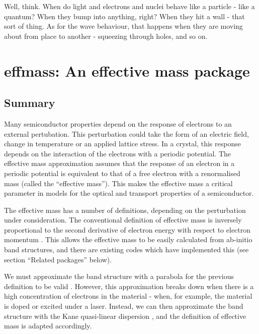 \begin{savequote}[8cm]
Well, think. When do light and electrons and nuclei behave like a particle - like a quantum? When they bump into anything, right? When they hit a wall - that sort of thing. As for the wave behaviour, that happens when they are moving about from place to another - squeezing through holes, and so on.
\end{savequote}

\chapter{\label{app:1-effmass}effmass: An effective mass package}

\section{Summary}
\label{sec:summary}

Many semiconductor properties depend on the response of electrons to an external pertubation. This perturbation could take the form of an electric field, change in temperature or an applied lattice stress. In a crystal, this response depends on the interaction of the electrons with a periodic potential. The effective mass approximation assumes that the response of an electron in a periodic potential is equivalent to that of a free electron with a renormalised mass (called the ``effective mass''). This makes the effective mass a critical parameter in models for the optical and transport properties of a semiconductor.

The effective mass has a number of definitions, depending on the perturbation under consideration. The conventional definition of effective mass is inversely proportional to the second derivative of electron energy with respect to electron momentum \autocite[p.~227]{Ashcroft1976}. This allows the effective mass to be easily calculated from ab-initio band structures, and there are existing codes which have implemented this (see section ``Related packages'' below).

We must approximate the band structure with a parabola for the previous definition to be valid \autocite{Ariel2012}. However, this approximation breaks down when there is a high concentration of electrons in the material - when, for example, the material is doped or excited under a laser. Instead, we can then approximate the band structure with the Kane quasi-linear dispersion \autocite{Kane1957}, and the definition of effective mass is adapted accordingly.

